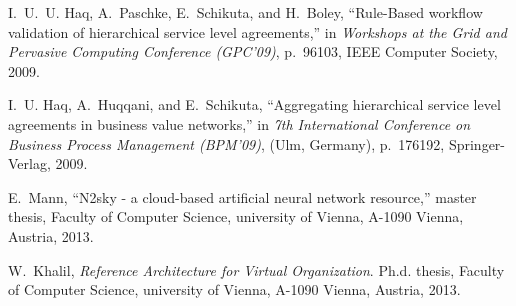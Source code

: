 \documentclass[]{article}
\begin{document}
\begin{thebibliography}{10}
I.~U.~U. Haq, A.~Paschke, E.~Schikuta, and H.~Boley, ``{Rule-Based} workflow
  validation of hierarchical service level agreements,'' in {\em Workshops at
  the Grid and Pervasive Computing Conference {(GPC'09)}},
  p.~96{\textendash}103, {IEEE} Computer Society, 2009.

I.~U. Haq, A.~Huqqani, and E.~Schikuta, ``Aggregating hierarchical service
  level agreements in business value networks,'' in {\em 7th International
  Conference on Business Process Management {(BPM'09)}}, (Ulm, Germany),
  p.~176{\textendash}192, {Springer-Verlag}, 2009.

E.~Mann, ``N2sky - a cloud-based artificial neural network resource,'' master
  thesis, Faculty of Computer Science, university of Vienna, A-1090 Vienna,
  Austria, 2013.

W.~Khalil, {\em Reference Architecture for Virtual Organization}.
\newblock Ph.d. thesis, Faculty of Computer Science, university of Vienna,
  A-1090 Vienna, Austria, 2013.

\end{thebibliography}
\end{document}
